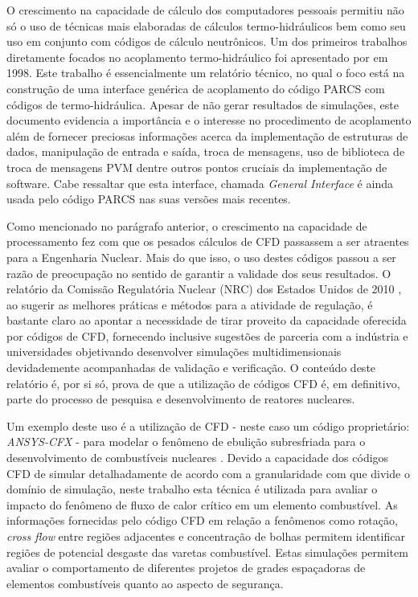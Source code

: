 \documentclass[12pt,openright,twoside,a4paper,english,french,spanish,brazil]{abntex2}
\begin{document}
O crescimento na capacidade de cálculo dos computadores pessoais permitiu não só o uso 
de técnicas mais elaboradas de cálculos termo-hidráulicos bem como seu uso em conjunto 
com códigos de cálculo neutrônicos. Um dos primeiros trabalhos diretamente focados no 
acoplamento termo-hidráulico foi apresentado por \cite{Barber98} em 1998. Este trabalho 
é essencialmente um relatório técnico, no qual o foco está na construção de uma interface 
genérica de acoplamento do código PARCS com códigos de termo-hidráulica. Apesar de não 
gerar resultados de simulações, este documento evidencia a importância e o interesse 
no procedimento de acoplamento além de fornecer preciosas informações acerca da 
implementação de estruturas de dados, manipulação de entrada e saída, troca de mensagens, 
uso de biblioteca de troca de mensagens PVM \cite{Geist94} 
dentre outros pontos cruciais da implementação de software. Cabe ressaltar que esta interface, 
chamada \textit{General Interface} é ainda usada pelo código PARCS nas suas versões mais 
recentes. 

Como mencionado no parágrafo anterior, o crescimento na capacidade de processamento 
fez com que os pesados cálculos de CFD passassem a ser atraentes 
para a Engenharia Nuclear. Mais do que isso, o uso destes códigos passou a ser razão 
de preocupação no sentido de garantir a validade dos seus resultados. O relatório 
da Comissão Regulatória Nuclear (NRC) dos Estados Unidos de 2010 \cite[p.69]{NUREG2010}, 
ao sugerir as melhores práticas e métodos para a atividade de regulação, é bastante claro 
ao apontar a necessidade de tirar proveito da capacidade oferecida por códigos de CFD, 
fornecendo inclusive sugestões de parceria com a indústria e universidades objetivando 
desenvolver simulações multidimensionais devidademente acompanhadas de validação e
verificação. O conteúdo deste relatório é, por si só, prova de que a utilização de 
códigos CFD é, em definitivo, parte do processo de 
pesquisa e desenvolvimento de reatores nucleares. 

Um exemplo deste uso é a utilização de CFD - neste caso um código proprietário: 
\textit{ANSYS-CFX} - para modelar o fenômeno de ebulição subresfriada para o 
desenvolvimento de combustíveis nucleares \cite{Krepper2007}. Devido a capacidade 
dos códigos CFD de simular detalhadamente de acordo com a granularidade com que 
divide o domínio de simulação, neste trabalho esta técnica é utilizada para avaliar 
o impacto do fenômeno de fluxo de calor crítico em um elemento combustível. As informações 
fornecidas pelo código CFD em relação a fenômenos como rotação, \textit{cross flow} entre 
regiões adjacentes e concentração de bolhas permitem identificar regiões de potencial 
desgaste das varetas combustível. Estas simulações permitem avaliar o comportamento
de diferentes projetos de grades espaçadoras de elementos combustíveis quanto ao aspecto 
de segurança.
\end{document}
